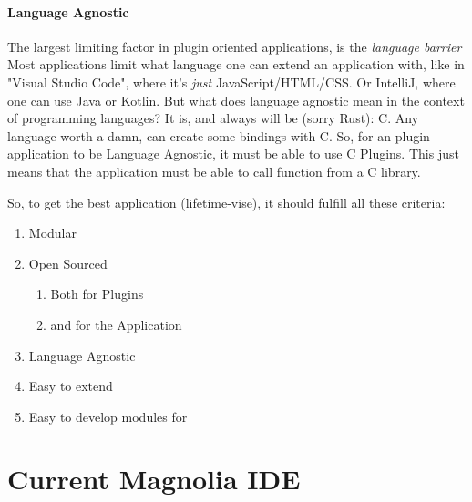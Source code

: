 \paragraph{Language Agnostic} The largest limiting factor in plugin oriented
applications, is the \textit{language barrier} Most applications limit what
language one can extend an application with, like in "Visual Studio Code", where
it's \textit{just} JavaScript/HTML/CSS. Or IntelliJ, where one can use Java or
Kotlin. But what does language agnostic mean in the context of programming
languages? It is, and always will be (sorry Rust): C. Any language worth a damn,
can create some bindings with C. So, for an plugin application to be Language
Agnostic, it must be able to use C Plugins. This just means that the application
must be able to call function from a C library.

So, to get the best application (lifetime-vise), it should fulfill all these criteria:

\begin{enumerate}
  \item Modular
  \item Open Sourced
    \begin{enumerate}
      \item Both for Plugins
      \item and for the Application
    \end{enumerate}
  \item Language Agnostic
  \item Easy to extend
  \item Easy to develop modules for
\end{enumerate}

\section{Current Magnolia IDE}
